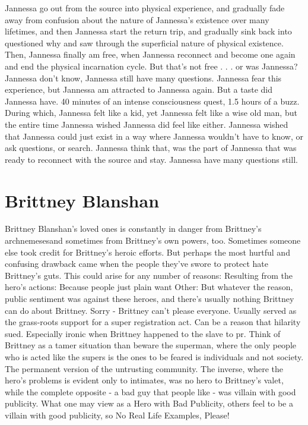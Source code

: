 \documentclass[12pt]{book}
\begin{document}
Jannessa go out from the source into physical experience, and gradually fade away from confusion about the nature of Jannessa's existence over many lifetimes, and then Jannessa start the return trip, and gradually sink back into questioned why and saw through the superficial nature of physical existence. Then, Jannessa finally am free, when Jannessa reconnect and become one again and end the physical incarnation cycle. But that's not free . . .  or was Jannessa? Jannessa don't know, Jannessa still have many questions. Jannessa fear this experience, but Jannessa am attracted to Jannessa again. But a taste did Jannessa have. 40 minutes of an intense consciousness quest, 1.5 hours of a buzz. During which, Jannessa felt like a kid, yet Jannessa felt like a wise old man, but the entire time Jannessa wished Jannessa did feel like either. Jannessa wished that Jannessa could just exist in a way where Jannessa wouldn't have to know, or ask questions, or search. Jannessa think that, was the part of Jannessa that was ready to reconnect with the source and stay. Jannessa have many questions still.



\chapter{Brittney Blanshan}

Brittney Blanshan's loved ones is constantly in danger from Brittney's archnemesesand sometimes from Brittney's own powers, too. Sometimes someone else took credit for Brittney's heroic efforts. But perhaps the most hurtful and confusing drawback came when the people they've swore to protect hate Brittney's guts. This could arise for any number of reasons: Resulting from the hero's actions: Because people just plain want Other: But whatever the reason, public sentiment was against these heroes, and there's usually nothing Brittney can do about Brittney. Sorry - Brittney can't please everyone. Usually served as the grass-roots support for a super registration act. Can be a reason that hilarity sued. Especially ironic when Brittney happened to the slave to pr. Think of Brittney as a tamer situation than beware the superman, where the only people who is acted like the supers is the ones to be feared is individuals and not society. The permanent version of the untrusting community. The inverse, where the hero's problems is evident only to intimates, was no hero to Brittney's valet, while the complete opposite - a bad guy that people like - was villain with good publicity. What one may view as a Hero with Bad Publicity, others feel to be a villain with good publicity, so No Real Life Examples, Please!
\end{document}
